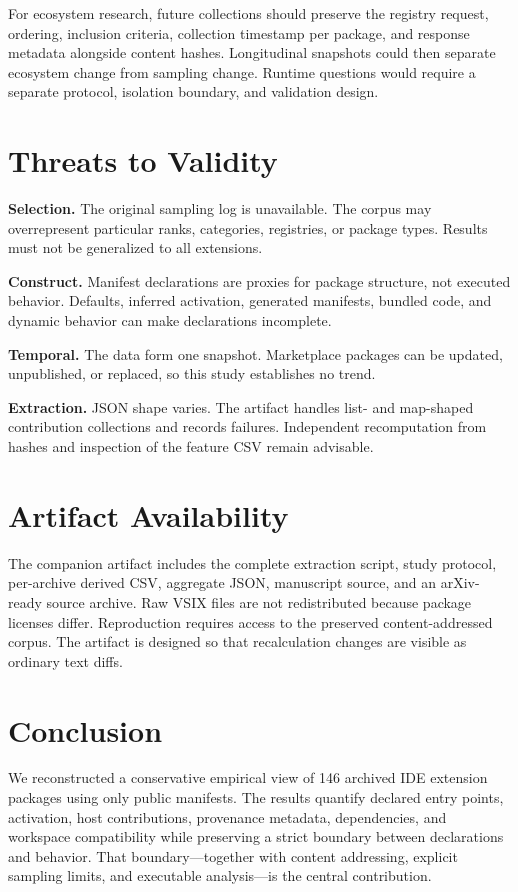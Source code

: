 \documentclass[10pt,twocolumn]{article}
\begin{document}
For ecosystem research, future collections should preserve the registry request, ordering, inclusion criteria, collection timestamp per package, and response metadata alongside content hashes. Longitudinal snapshots could then separate ecosystem change from sampling change. Runtime questions would require a separate protocol, isolation boundary, and validation design.

\section{Threats to Validity}
\textbf{Selection.} The original sampling log is unavailable. The corpus may overrepresent particular ranks, categories, registries, or package types. Results must not be generalized to all extensions.

\textbf{Construct.} Manifest declarations are proxies for package structure, not executed behavior. Defaults, inferred activation, generated manifests, bundled code, and dynamic behavior can make declarations incomplete.

\textbf{Temporal.} The data form one snapshot. Marketplace packages can be updated, unpublished, or replaced, so this study establishes no trend.

\textbf{Extraction.} JSON shape varies. The artifact handles list- and map-shaped contribution collections and records failures. Independent recomputation from hashes and inspection of the feature CSV remain advisable.

\section{Artifact Availability}
The companion artifact includes the complete extraction script, study protocol, per-archive derived CSV, aggregate JSON, manuscript source, and an arXiv-ready source archive. Raw VSIX files are not redistributed because package licenses differ. Reproduction requires access to the preserved content-addressed corpus. The artifact is designed so that recalculation changes are visible as ordinary text diffs.

\section{Conclusion}
We reconstructed a conservative empirical view of 146 archived IDE extension packages using only public manifests. The results quantify declared entry points, activation, host contributions, provenance metadata, dependencies, and workspace compatibility while preserving a strict boundary between declarations and behavior. That boundary—together with content addressing, explicit sampling limits, and executable analysis—is the central contribution.
\end{document}
